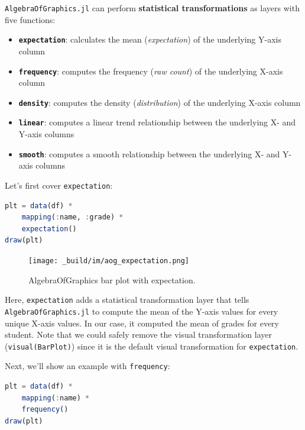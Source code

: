 \documentclass[
  notoc %
]{tufte-book}
\providecommand{\tightlist}{%
  \setlength{\itemsep}{0pt}\setlength{\parskip}{0pt}
}
\newcommand{\passthrough}[1]{#1}
\begin{document}
\passthrough{\lstinline!AlgebraOfGraphics.jl!} can perform
\textbf{statistical transformations} as layers with five functions:

\begin{itemize}
\tightlist
\item
  \textbf{\passthrough{\lstinline!expectation!}}: calculates the mean
  (\emph{expectation}) of the underlying Y-axis column
\item
  \textbf{\passthrough{\lstinline!frequency!}}: computes the frequency
  (\emph{raw count}) of the underlying X-axis column
\item
  \textbf{\passthrough{\lstinline!density!}}: computes the density
  (\emph{distribution}) of the underlying X-axis column
\item
  \textbf{\passthrough{\lstinline!linear!}}: computes a linear trend
  relationship between the underlying X- and Y-axis columns
\item
  \textbf{\passthrough{\lstinline!smooth!}}: computes a smooth
  relationship between the underlying X- and Y-axis columns
\end{itemize}

Let's first cover \passthrough{\lstinline!expectation!}:

\begin{lstlisting}[language=Julia]
plt = data(df) *
    mapping(:name, :grade) *
    expectation()
draw(plt)
\end{lstlisting}

\begin{figure}
\hypertarget{fig:aog_expectation}{%
\centering
\texttt{[image: \_build/im/aog\_expectation.png]}
\caption{AlgebraOfGraphics bar plot with
expectation.}\label{fig:aog_expectation}
}
\end{figure}

Here, \passthrough{\lstinline!expectation!} adds a statistical
transformation layer that tells
\passthrough{\lstinline!AlgebraOfGraphics.jl!} to compute the mean of
the Y-axis values for every unique X-axis values. In our case, it
computed the mean of grades for every student. Note that we could safely
remove the visual transformation layer
(\passthrough{\lstinline!visual(BarPlot)!}) since it is the default
visual transformation for \passthrough{\lstinline!expectation!}.

Next, we'll show an example with \passthrough{\lstinline!frequency!}:

\begin{lstlisting}[language=Julia]
plt = data(df) *
    mapping(:name) *
    frequency()
draw(plt)
\end{lstlisting}
\end{document}
